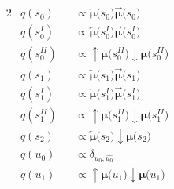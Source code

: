 \documentclass[fleqn]{article}
\begin{document}
\begin{minipage}[t]{0.5\textwidth}
\begin{alignat}{2}
         & q(s_0)                                                              &  & \propto \bm{\overleftarrow{\mu}(}s_0\bm{)} \bm{\overrightarrow{\mu}(}s_0\bm{)}                                                                                                 \\
         & q(s^{\scriptscriptstyle I}_0)                                       &  & \propto \bm{\overleftarrow{\mu}(}s^{\scriptscriptstyle I}_0\bm{)} \bm{\overrightarrow{\mu}(}s^{\scriptscriptstyle I}_0\bm{)}                                                   \\
         & q(s^{\scriptscriptstyle II}_0)                                      &  & \propto \bm{{\uparrow}{\mu}(}s^{\scriptscriptstyle II}_0\bm{)} \bm{{\downarrow}{\mu}(}s^{\scriptscriptstyle II}_0\bm{)}                                                        \\
         & q(s_1)                                                              &  & \propto \bm{\overleftarrow{\mu}(}s_1\bm{)} \bm{\overrightarrow{\mu}(}s_1\bm{)}                                                                                                 \\
         & q(s^{\scriptscriptstyle I}_1)                                       &  & \propto \bm{\overleftarrow{\mu}(}s^{\scriptscriptstyle I}_1\bm{)} \bm{\overrightarrow{\mu}(}s^{\scriptscriptstyle I}_1\bm{)}                                                   \\
         & q(s^{\scriptscriptstyle II}_1)                                      &  & \propto \bm{{\uparrow}{\mu}(}s^{\scriptscriptstyle II}_1\bm{)} \bm{{\downarrow}{\mu}(}s^{\scriptscriptstyle II}_1\bm{)}                                                        \\
         & q(s_2)                                                              &  & \propto \bm{\overleftarrow{\mu}(}s_2\bm{)} \bm{{\downarrow}{\mu}(}s_2\bm{)}                                                                                                    \\
         & q(u_0)                                                              &  & \propto \delta_{u_0,\hat{u_0}}                                                                                                                                                 \\
         & q(u_1)                                                              &  & \propto \bm{{\uparrow}{\mu}(}u_1\bm{)} \bm{{\downarrow}{\mu}(}u_1\bm{)}                                                                                                        \\

\end{alignat}
\end{minipage}
\end{document}
